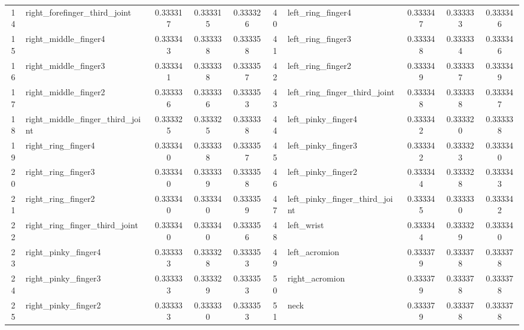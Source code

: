 \documentclass[runningheads]{llncs}
\begin{document}
\begin{table}[H]
{\begin{tabular}{clcccclccc}
14 & right\_forefinger\_third\_joint & 0.333317 & 0.333315 & 0.333326 & 40 & left\_ring\_finger4 & 0.333347 & 0.333333 & 0.333346 \\
15 & right\_middle\_finger4 & 0.333343 & 0.333338 & 0.333358 & 41 & left\_ring\_finger3 & 0.333348 & 0.333334 & 0.333346 \\
16 & right\_middle\_finger3 & 0.333341 & 0.333338 & 0.333357 & 42 & left\_ring\_finger2 & 0.333349 & 0.333337 & 0.333349 \\
17 & right\_middle\_finger2 & 0.333336 & 0.333336 & 0.333353 & 43 & left\_ring\_finger\_third\_joint & 0.333348 & 0.333338 & 0.333347 \\
18 & right\_middle\_finger\_third\_joint & 0.333325 & 0.333325 & 0.333338 & 44 & left\_pinky\_finger4 & 0.333342 & 0.333320 & 0.333338 \\
19 & right\_ring\_finger4 & 0.333340 & 0.333338 & 0.333357 & 45 & left\_pinky\_finger3 & 0.333342 & 0.333323 & 0.333340 \\
20 & right\_ring\_finger3 & 0.333340 & 0.333339 & 0.333358 & 46 & left\_pinky\_finger2 & 0.333344 & 0.333328 & 0.333343 \\
21 & right\_ring\_finger2 & 0.333340 & 0.333340 & 0.333359 & 47 & left\_pinky\_finger\_third\_joint & 0.333345 & 0.333330 & 0.333342 \\
22 & right\_ring\_finger\_third\_joint & 0.333340 & 0.333340 & 0.333356 & 48 & left\_wrist & 0.333344 & 0.333329 & 0.333340 \\
23 & right\_pinky\_finger4 & 0.333333 & 0.333328 & 0.333353 & 49 & left\_acromion & 0.333379 & 0.333378 & 0.333378 \\
24 & right\_pinky\_finger3 & 0.333333 & 0.333329 & 0.333353 & 50 & right\_acromion & 0.333379 & 0.333378 & 0.333378 \\
25 & right\_pinky\_finger2 & 0.333333 & 0.333330 & 0.333353 & 51 & neck & 0.333379 & 0.333378 & 0.333378 \\
\hline
\end{tabular}
}
\end{table}
\end{document}
